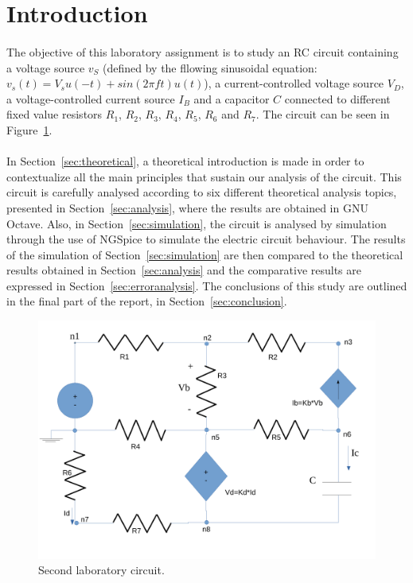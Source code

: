 \section{Introduction}
\label{sec:introduction}

\paragraph{} 
The objective of this laboratory assignment is to study an RC circuit containing a voltage source $v_S$ (defined by the fllowing sinusoidal equation: $v_s (t) = V_s u(−t) + sin(2 \pi ft)u(t) $), a current-controlled voltage source $V_D$, a voltage-controlled current source $I_B$ and a capacitor $C$ connected to different fixed value resistors $R_1$, $R_2$, $R_3$, $R_4$, $R_5$, $R_6$ and $R_7$.
The circuit can be seen in Figure~\ref{fig:circuit}.


\paragraph{}
In Section~\ref{sec:theoretical}, a theoretical introduction is made in order to contextualize all the main principles that sustain our analysis of the circuit. This circuit is carefully analysed according to six different theoretical analysis topics, presented in Section~\ref{sec:analysis}, where the results are obtained in GNU Octave. Also, in Section~\ref{sec:simulation}, the circuit is analysed by simulation through the use of NGSpice to simulate the electric circuit behaviour. The results of the simulation of Section~\ref{sec:simulation} are then compared to the theoretical results obtained in Section~\ref{sec:analysis} and the comparative results are expressed in Section~\ref{sec:erroranalysis}. The conclusions of this study are outlined in the final part of the report, in Section~\ref{sec:conclusion}.


\begin{figure}[h] \centering
\includegraphics[width=0.4\linewidth]{circuit.pdf}
\caption{Second laboratory circuit.}
\label{fig:circuit}
\end{figure}

